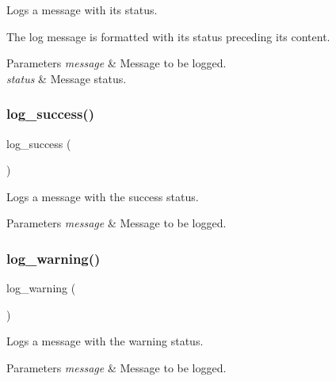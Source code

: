 Logs a message with its status. 

The log message is formatted with its status preceding its content. 
\begin{DoxyParams}{Parameters}
{\em message} & Message to be logged. \\
\hline
{\em status} & Message status. \\
\hline
\end{DoxyParams}
\mbox{\label{group__log_gab87ab941c025cd7a51097e6a4d9a2880}} 
\subsubsection{\texorpdfstring{log\+\_\+success()}{log\_success()}}
{\footnotesize\ttfamily log\+\_\+success (\begin{DoxyParamCaption}\item[{message}]{ }\end{DoxyParamCaption})}



Logs a message with the \textquotesingle{}success\textquotesingle{} status. 


\begin{DoxyParams}{Parameters}
{\em message} & Message to be logged. \\
\hline
\end{DoxyParams}
\mbox{\label{group__log_gab5a7732343823ce546c484692d6812ff}} 
\subsubsection{\texorpdfstring{log\+\_\+warning()}{log\_warning()}}
{\footnotesize\ttfamily log\+\_\+warning (\begin{DoxyParamCaption}\item[{message}]{ }\end{DoxyParamCaption})}



Logs a message with the \textquotesingle{}warning\textquotesingle{} status. 


\begin{DoxyParams}{Parameters}
{\em message} & Message to be logged. \\
\hline
\end{DoxyParams}
